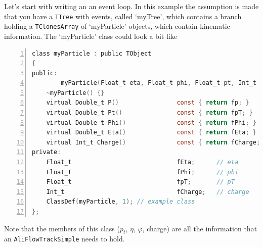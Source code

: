 \documentclass[a4paper]{book}
\numberwithin{equation}{subsection}
\begin{document}
Let's start with writing an an event loop. In this example the assumption is made that you have a \texttt{TTree} with events, called `myTree', which contains a branch holding a \texttt{TClonesArray} of `myParticle' objects, which contain kinematic information. The `myParticle' class could look a bit like
\begin{lstlisting}[language=C, numbers=left]
class myParticle : public TObject
{
public:
        myParticle(Float_t eta, Float_t phi, Float_t pt, Int_t charge) : fEta(eta), fPhi(phi), fpT(pt), fCharge(charge) {  }
    ~myParticle() {}
    virtual Double_t P()                const { return fp; }
    virtual Double_t Pt()               const { return fpT; }
    virtual Double_t Phi()              const { return fPhi; }
    virtual Double_t Eta()              const { return fEta; }
    virtual Int_t Charge()              const { return fCharge; }
private:
    Float_t                             fEta;      // eta
    Float_t                             fPhi;      // phi
    Float_t                             fpT;       // pT
    Int_t                               fCharge;   // charge
    ClassDef(myParticle, 1); // example class
};\end{lstlisting}
Note that the members of this class ($p_t$, $\eta$, $\varphi$, charge) are all the information that an \texttt{AliFlowTrackSimple} needs to hold.
\end{document}
